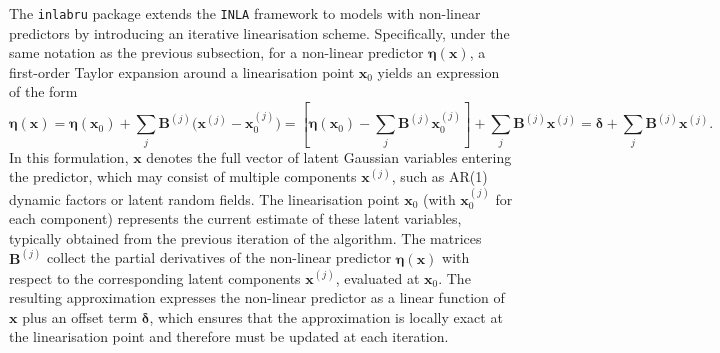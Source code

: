 \documentclass[
  12pt]{article}
\begin{document}
The \texttt{inlabru} package \citep{lindgren2024inlabru} extends the \texttt{INLA} framework to models with non-linear predictors by introducing an iterative linearisation scheme. Specifically, under the same notation as the previous subsection, for a non-linear predictor $\boldsymbol{\eta}(\boldsymbol{x})$, a first-order Taylor expansion around a linearisation point $\boldsymbol{x}_{0}$ yields an expression of the form
\[
\boldsymbol{\eta}(\boldsymbol{x}) 
= \boldsymbol{\eta}(\boldsymbol{x}_{0}) 
+ \sum_{j} \boldsymbol{B}^{(j)}\bigl(\boldsymbol{x}^{(j)} - \boldsymbol{x}_{0}^{(j)}\bigr) 
= \left[\boldsymbol{\eta}(\boldsymbol{x}_{0}) - \sum_{j}\boldsymbol{B}^{(j)}\boldsymbol{x}_{0}^{(j)}\right] 
+ \sum_{j}\boldsymbol{B}^{(j)}\boldsymbol{x}^{(j)} 
= \boldsymbol{\delta} + \sum_{j}\boldsymbol{B}^{(j)}\boldsymbol{x}^{(j)}.
\]
In this formulation, $\boldsymbol{x}$ denotes the full vector of latent Gaussian variables entering the predictor, which may consist of multiple components $\boldsymbol{x}^{(j)}$, such as AR(1) dynamic factors or latent random fields. The linearisation point $\boldsymbol{x}_{0}$ (with $\boldsymbol{x}_0^{(j)}$ for each component) represents the current estimate of these latent variables, typically obtained from the previous iteration of the algorithm. The matrices $\boldsymbol{B}^{(j)}$ collect the partial derivatives of the non-linear predictor $\boldsymbol{\eta}(\boldsymbol{x})$ with respect to the corresponding latent components $\boldsymbol{x}^{(j)}$, evaluated at $\boldsymbol{x}_{0}$. The resulting approximation expresses the non-linear predictor as a linear function of $\boldsymbol{x}$ plus an offset term $\boldsymbol{\delta}$, which ensures that the approximation is locally exact at the linearisation point and therefore must be updated at each iteration.
\end{document}
